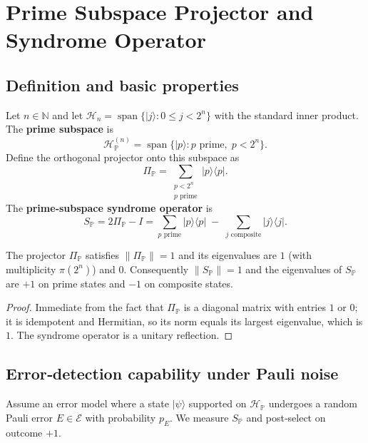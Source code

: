 \documentclass[12pt,a4paper]{article}
\begin{document}
\section{Prime Subspace Projector and Syndrome Operator}

\subsection{Definition and basic properties}
Let \(n\in\mathbb{N}\) and let \(\mathcal{H}_n = \operatorname{span}\{|j\rangle : 0\le j < 2^n\}\) with the standard inner product.  The \textbf{prime subspace} is
\[
\mathcal{H}_{\mathbb{P}}^{(n)} = \operatorname{span}\{|p\rangle : p \text{ prime},\; p<2^n\}.
\]
Define the orthogonal projector onto this subspace as
\[
\Pi_{\mathbb{P}} = \sum_{\substack{p<2^n\\p\text{ prime}}} |p\rangle\langle p|.
\]
The \textbf{prime‑subspace syndrome operator} is
\[
S_{\mathbb{P}} = 2\Pi_{\mathbb{P}} - I = \sum_{p\text{ prime}}|p\rangle\langle p| \;-\; \sum_{j\text{ composite}}|j\rangle\langle j|.
\]

\begin{lemma}\label{lem:Pi-norm}
The projector \(\Pi_{\mathbb{P}}\) satisfies \(\|\Pi_{\mathbb{P}}\|=1\) and its eigenvalues are \(1\) (with multiplicity \(\pi(2^n)\)) and \(0\). Consequently \(\|S_{\mathbb{P}}\|=1\) and the eigenvalues of \(S_{\mathbb{P}}\) are \(+1\) on prime states and \(-1\) on composite states.
\end{lemma}
\begin{proof}
Immediate from the fact that \(\Pi_{\mathbb{P}}\) is a diagonal matrix with entries \(1\) or \(0\); it is idempotent and Hermitian, so its norm equals its largest eigenvalue, which is \(1\).  The syndrome operator is a unitary reflection.
\end{proof}

\subsection{Error‑detection capability under Pauli noise}
Assume an error model where a state \(|\psi\rangle\) supported on \(\mathcal{H}_{\mathbb{P}}\) undergoes a random Pauli error \(E\in\mathcal{E}\) with probability \(p_E\).  We measure \(S_{\mathbb{P}}\) and post‑select on outcome \(+1\).
\end{document}
